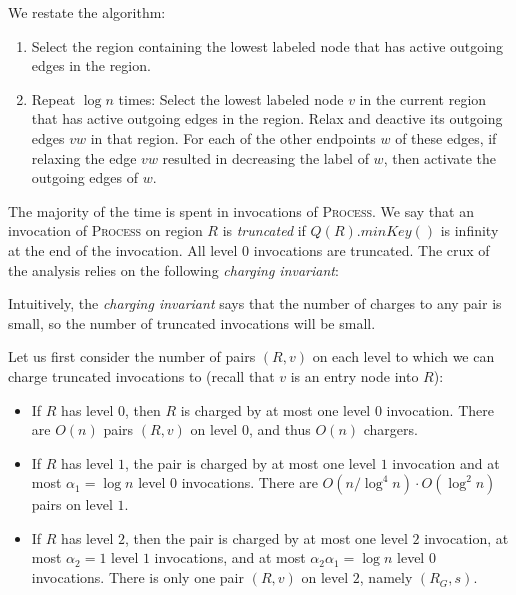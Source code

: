 \documentclass[12pt]{article}
\begin{document}
We restate the algorithm:
\begin{enumerate}
\item Select the region containing the lowest labeled node that has active outgoing edges in the region.
\item Repeat $\log n$ times: Select the lowest labeled node $v$ in the current region that has active outgoing edges in the region. Relax and deactive its outgoing edges $vw$ in that region. For each of the other endpoints $w$ of these edges, if relaxing the edge $vw$ resulted in decreasing the label of $w$, then activate the outgoing edges of $w$.
\end{enumerate}

The majority of the time is spent in invocations of \textsc{Process}. We say that an invocation of \textsc{Process} on region $R$ is \emph{truncated} if $Q(R).minKey()$ is infinity at the end of the invocation. All level $0$ invocations are truncated. The crux of the analysis relies on the following \emph{charging invariant}:

\noindent{}

Intuitively, the \emph{charging invariant} says that the number of charges to any pair is small, so the number of truncated invocations will be small.

 Let us first consider the number of pairs $(R,v)$ on each level to which we can charge truncated invocations to (recall that $v$ is an entry node into $R$):
\begin{itemize}
\item If $R$ has level $0$, then $R$ is charged by at most one level $0$ invocation. There are $O(n)$ pairs $(R,v)$ on level $0$, and thus $O(n)$ chargers.
\item If $R$ has level $1$, the pair is charged by at most one level $1$ invocation and at most $\alpha_1 = \log n$ level $0$ invocations. There are $O(n/\log^4n)\cdot O(\log^2 n)$ pairs on level $1$.
\item If $R$ has level $2$, then the pair is charged by at most one level $2$ invocation, at most $\alpha_2 = 1$ level $1$ invocations, and at most $\alpha_2\alpha_1 = \log n$ level $0$ invocations. There is only one pair $(R,v)$ on level $2$, namely $(R_G,s)$.
\end{itemize}
\end{document}
